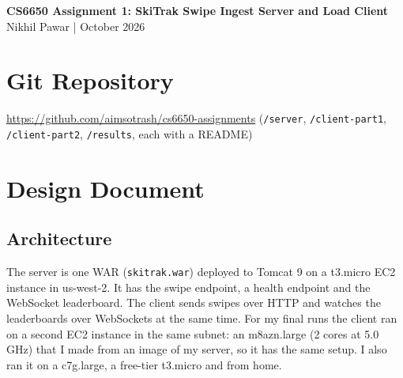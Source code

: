 \documentclass[10pt]{article}
\begin{document}
\begin{center}
{\Large\bfseries CS6650 Assignment 1: SkiTrak Swipe Ingest Server and Load Client}\\[4pt]
Nikhil Pawar \quad | \quad October 2026
\end{center}

\section{Git Repository}
\url{https://github.com/aimsotrash/cs6650-assignments} \quad (\texttt{/server}, \texttt{/client-part1}, \texttt{/client-part2}, \texttt{/results}, each with a README)

\section{Design Document}

\subsection{Architecture}
The server is one WAR (\texttt{skitrak.war}) deployed to Tomcat 9 on a t3.micro EC2 instance in us-west-2. It has the swipe endpoint, a health endpoint and the WebSocket leaderboard. The client sends swipes over HTTP and watches the leaderboards over WebSockets at the same time. For my final runs the client ran on a second EC2 instance in the same subnet: an m8azn.large (2 cores at 5.0 GHz) that I made from an image of my server, so it has the same setup. I also ran it on a c7g.large, a free-tier t3.micro and from home.
\end{document}
